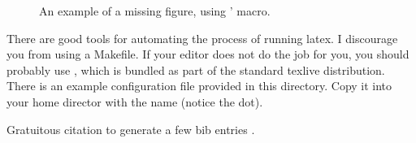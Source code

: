 \begin{figure}
  \centering
  \caption{An example of a missing figure, using '
    \textjava{\\missingfigure} macro.}
  \label{fig:todo}
\end{figure}

There are good tools for automating the process of running latex.  I
discourage you from using a Makefile.  If your editor does not do the
job for you, you should probably use , which is
bundled as part of the standard texlive distribution.  There is an
example configuration file provided in this directory.  Copy it into
your home director with the name  (notice the
dot).

Gratuitous citation to generate a few bib entries \cite{BH:04,SBF:12,YBFH:12}.

